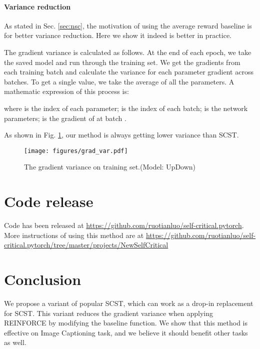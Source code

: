 \documentclass[11pt,a4paper]{article}
\begin{document}
\paragraph{Variance reduction}
As stated in Sec. \ref{sec:nsc}, the motivation of using the average reward baseline is for better variance reduction. Here we show it indeed is better in practice.

The gradient variance is calculated as follows. At the end of each epoch, we take the saved model and run through the training set. We get the gradients from each training batch and calculate the variance for each parameter gradient across batches. To get a single value, we take the average of all the parameters. A mathematic expression of this process is:


where  is the index of each parameter;  is the index of each batch;  is the network parameters;  is the gradient of  at batch .

As shown in Fig. \ref{fig:grad_var}, our method is always getting lower variance than SCST.

\begin{figure}
\centering
\texttt{[image: figures/grad\_var.pdf]}
\caption{The gradient variance on training set.(Model: UpDown)}
\label{fig:grad_var}
\end{figure}

\section{Code release}
Code has been released at \url{https://github.com/ruotianluo/self-critical.pytorch}. More instructions of using this method are at \url{https://github.com/ruotianluo/self-critical.pytorch/tree/master/projects/NewSelfCritical}

\section{Conclusion}
We propose a variant of popular SCST, which can work as a drop-in replacement for SCST. This variant reduces the gradient variance when applying REINFORCE by modifying the baseline function. We show that this method is effective on Image Captioning task, and we believe it should benefit other tasks as well.




\end{document}
